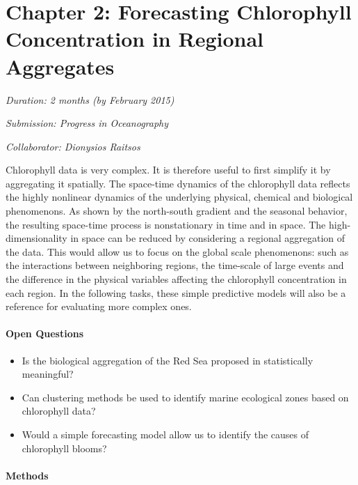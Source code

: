 \section{Chapter 2: Forecasting Chlorophyll Concentration in Regional
Aggregates}

\noindent \emph{Duration: 2 months (by February 2015)}

\noindent \emph{Submission: Progress in Oceanography}

\noindent \emph{Collaborator: Dionysios Raitsos}

\vspace{5mm}

Chlorophyll data is very complex. It is therefore useful to first simplify it
by aggregating it spatially. The space-time dynamics of the chlorophyll data
reflects the highly nonlinear dynamics of the underlying physical, chemical and
biological phenomenons. As shown by the north-south gradient and the seasonal
behavior, the resulting space-time process is nonstationary in time and in
space. The high-dimensionality in space can be reduced by considering a
regional aggregation of the data. This would allow us to focus on the global
scale phenomenons: such as the interactions between neighboring regions, the
time-scale of large events and the difference in the physical variables
affecting the chlorophyll concentration in each region. In the following tasks,
these simple predictive models will also be a reference for evaluating more
complex ones. 

\paragraph{Open Questions}

\begin{itemize}

\item Is the biological aggregation of the Red Sea proposed in
\cite{Raitsos2013} statistically meaningful?

\item Can clustering methods be used to identify marine ecological zones based
on chlorophyll data?

\item Would a simple forecasting model allow us to identify the causes of
chlorophyll blooms?

\end{itemize}

\paragraph{Methods}

